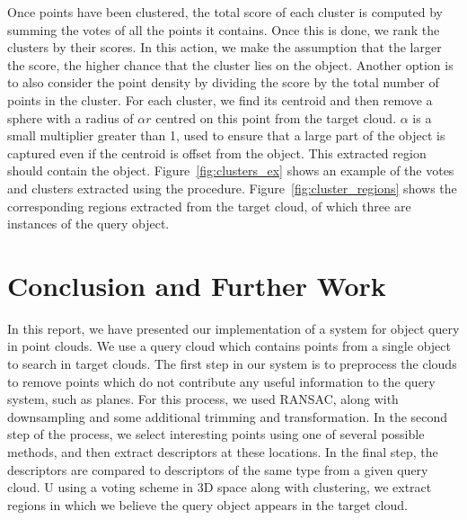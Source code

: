 \documentclass[11pt,a4paper]{kth-mag}
\begin{document}
Once points have been clustered, the total score of each cluster is computed by
summing the votes of all the points it contains. Once this is done, we rank the
clusters by their scores. In this action, we make the assumption that the larger
the score, the higher chance that the cluster lies on the object. Another option
is to also consider the point density by dividing the score by the total number
of points in the cluster. For each cluster, we find its centroid and then remove
a sphere with a radius of $\alpha r$ centred on this point from the target
cloud. $\alpha$ is a small multiplier greater than 1, used to ensure that a
large part of the object is captured even if the centroid is offset from the
object. This extracted region should contain the object.
Figure~\ref{fig:clusters_ex} shows an example of the votes and clusters
extracted using the procedure. Figure~\ref{fig:cluster_regions} shows the
corresponding regions extracted from the target cloud, of which three are
instances of the query object.

\chapter{Conclusion and Further Work}
\label{chap:conc}
In this report, we have presented our implementation of a system for object
query in point clouds. We use a query cloud which contains points from a single
object to search in target clouds. The first step in our system is to preprocess
the clouds to remove points which do not contribute any useful information to
the query system, such as planes. For this process, we used RANSAC, along with
downsampling and some additional trimming and transformation. In the second step
of the process, we select interesting points using one of several possible
methods, and then extract descriptors at these locations. In the final step, the
descriptors are compared to descriptors of the same type from a given query
cloud. U using a voting scheme in 3D space along with clustering, we extract
regions in which we believe the query object appears in the target cloud.
\end{document}

